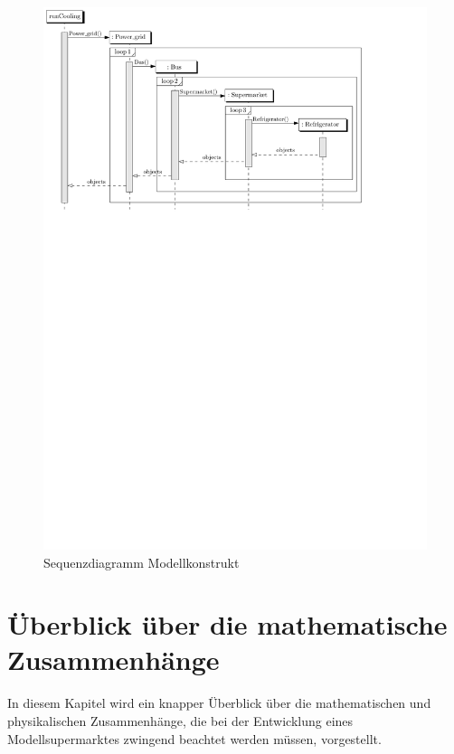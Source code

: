 \begin{figure}[h]
\caption{Sequenzdiagramm Modellkonstrukt}
	\label{uml_sequence}
	\begin{center}
	\includegraphics[scale=0.8]{images/Theorie_Super/sequence_one}
	\end{center}
\end{figure}


\section{Überblick über die mathematische Zusammenhänge}

In diesem Kapitel wird ein knapper \"Uberblick über die mathematischen und
physikalischen Zusammenhänge, die bei der Entwicklung eines Modellsupermarktes
zwingend beachtet werden müssen, vorgestellt.

